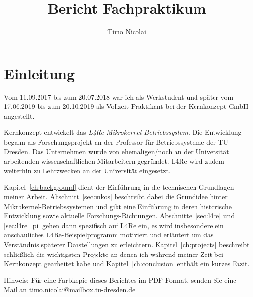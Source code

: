 \documentclass[ngerman]{tudscrreprt}
\begin{document}
\sloppy


\title{Bericht Fachpraktikum}

\author{%
  Timo Nicolai
}


\headingsvskip=-100pt

\maketitle

\confirmation

\tableofcontents

\pagebreak

\chapter{Einleitung}

Vom 11.09.2017 bis zum 20.07.2018 war ich als Werkstudent und später vom
17.06.2019 bis zum 20.10.2019 als Vollzeit-Praktikant bei der Kernkonzept GmbH
angestellt.

Kernkonzept entwickelt das \textit{L4Re Mikrokernel-Betriebssystem}.
Die Entwicklung begann als Forschungsprojekt an der Professor für
Betriebssysteme der TU Dresden. Das Unternehmen wurde von ehemaligen/noch an
der Universität arbeitenden wissenschaftlichen Mitarbeitern gegründet. L4Re
wird zudem weiterhin zu Lehrzwecken an der Universität eingesetzt.

Kapitel~\ref{ch:background} dient der Einführung in die technischen Grundlagen
meiner Arbeit. Abschnitt~\ref{sec:mkos} beschreibt dabei die Grundidee hinter
Mikrokernel-Betriebssystemen und gibt eine Einführung in deren historische
Entwicklung sowie aktuelle Forschungs-Richtungen.  Abschnitte~\ref{sec:l4re}
und \ref{sec:l4re_pi} gehen dann spezifisch auf L4Re ein, es wird insbesondere
ein anschauliches L4Re-Beispielprogramm motiviert und erläutert um das
Verständnis späterer Darstellungen zu erleichtern.  Kapitel~\ref{ch:projects}
beschreibt schließlich die wichtigsten Projekte an denen ich während meiner
Zeit bei Kernkonzept gearbeitet habe und Kapitel~\ref{ch:conclusion} enthält
ein kurzes Fazit.

\vspace{\baselineskip}

\noindent
Hinweis: Für eine Farbkopie dieses Berichtes im PDF-Format, senden Sie eine
Mail an \url{timo.nicolai@mailbox.tu-dresden.de}.
\end{document}
